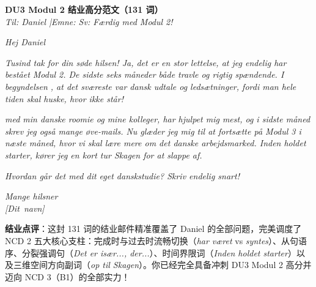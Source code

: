 \begin{answerbox}
\textbf{DU3 Modul 2 结业高分范文（131 词）}\\
\textit{Til: Daniel \quad|\quad Emne: Sv: Færdig med Modul 2!}

\textit{Hej Daniel}

\textit{Tusind tak for din søde hilsen! Ja, det er en stor lettelse, at jeg endelig har bestået Modul 2. De sidste seks måneder  både travle og rigtig spændende. I begyndelsen , at det sværeste var dansk udtale og ledsætninger, fordi man hele tiden skal huske, hvor \textit{ikke} står!}

\textit{ med min danske roomie og mine kolleger,  har hjulpet mig mest, og i sidste måned skrev jeg også mange øve-mails. Nu glæder jeg mig til at fortsætte på Modul 3 i næste måned, hvor vi skal lære mere om det danske arbejdsmarked. Inden holdet starter, kører jeg en kort tur  Skagen for at slappe af.}

\textit{Hvordan går det med dit eget danskstudie? Skriv endelig snart!}

\textit{Mange hilsner\\
\mbox{[Dit navn]}}

\small\textbf{结业点评}：这封 131 词的结业邮件精准覆盖了 Daniel 的全部问题，完美调度了 NCD 2 五大核心支柱：完成时与过去时流畅切换（\textit{har været} vs \textit{syntes}）、从句语序、分裂强调句（\textit{Det er især..., der...}）、时间界限词（\textit{Inden holdet starter}）以及三维空间方向副词（\textit{op til Skagen}）。你已经完全具备冲刺 DU3 Modul 2 高分并迈向 NCD 3（B1）的全部实力！
\end{answerbox}
